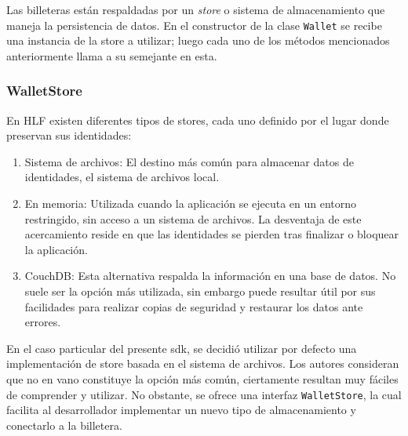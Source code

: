 Las billeteras están respaldadas por un \emph{store} o sistema de almacenamiento que maneja la persistencia de datos. En el constructor de la clase \texttt{Wallet} se recibe una instancia de la store a utilizar; luego cada uno de los m\'etodos mencionados anteriormente llama a su semejante en esta.

\subsubsection{WalletStore}

En HLF existen diferentes tipos de stores, cada uno definido por el lugar donde preservan sus identidades:

\begin{enumerate}
	\item Sistema de archivos: El destino más común para almacenar datos de identidades, el sistema de archivos local. 
	
	\item En memoria: Utilizada cuando la aplicación se ejecuta en un entorno restringido, sin acceso a un sistema de archivos. La desventaja de este acercamiento reside en que las identidades se pierden tras finalizar o bloquear la aplicación.%
	
	\item CouchDB: Esta alternativa respalda la informaci\'on en una base de datos. No suele ser la opci\'on m\'as utilizada, sin embargo puede resultar \'util por sus facilidades para realizar copias de seguridad y restaurar los datos ante errores.
	
\end{enumerate}

En el caso particular del presente sdk, se decidi\'o utilizar por defecto una implementaci\'on de store basada en el sistema de archivos. Los autores consideran que no en vano constituye la opci\'on m\'as com\'un, ciertamente resultan muy f\'aciles de comprender y utilizar. No obstante, se ofrece una interfaz \texttt{WalletStore}, la cual facilita al desarrollador implementar un nuevo tipo de almacenamiento y conectarlo a la billetera.

